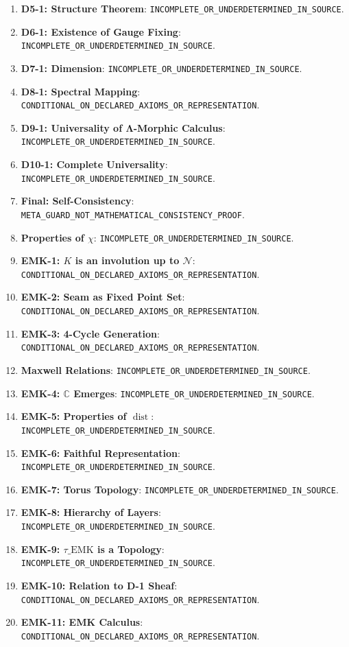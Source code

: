 \documentclass[12pt, oneside]{article}
\newcommand{\N}{\mathcal{N}}
\newcommand{\dist}{\mathop{\mathrm{dist}}}
\begin{document}
\begin{enumerate}
\item \textbf{D5-1: Structure Theorem}: \texttt{INCOMPLETE\_OR\_UNDERDETERMINED\_IN\_SOURCE}.
\item \textbf{D6-1: Existence of Gauge Fixing}: \texttt{INCOMPLETE\_OR\_UNDERDETERMINED\_IN\_SOURCE}.
\item \textbf{D7-1: Dimension}: \texttt{INCOMPLETE\_OR\_UNDERDETERMINED\_IN\_SOURCE}.
\item \textbf{D8-1: Spectral Mapping}: \texttt{CONDITIONAL\_ON\_DECLARED\_AXIOMS\_OR\_REPRESENTATION}.
\item \textbf{D9-1: Universality of Λ-Morphic Calculus}: \texttt{INCOMPLETE\_OR\_UNDERDETERMINED\_IN\_SOURCE}.
\item \textbf{D10-1: Complete Universality}: \texttt{INCOMPLETE\_OR\_UNDERDETERMINED\_IN\_SOURCE}.
\item \textbf{Final: Self-Consistency}: \texttt{META\_GUARD\_NOT\_MATHEMATICAL\_CONSISTENCY\_PROOF}.
\item \textbf{Properties of $\chi$}: \texttt{INCOMPLETE\_OR\_UNDERDETERMINED\_IN\_SOURCE}.
\item \textbf{EMK-1: $K$ is an involution up to $\N$}: \texttt{CONDITIONAL\_ON\_DECLARED\_AXIOMS\_OR\_REPRESENTATION}.
\item \textbf{EMK-2: Seam as Fixed Point Set}: \texttt{CONDITIONAL\_ON\_DECLARED\_AXIOMS\_OR\_REPRESENTATION}.
\item \textbf{EMK-3: 4-Cycle Generation}: \texttt{CONDITIONAL\_ON\_DECLARED\_AXIOMS\_OR\_REPRESENTATION}.
\item \textbf{Maxwell Relations}: \texttt{INCOMPLETE\_OR\_UNDERDETERMINED\_IN\_SOURCE}.
\item \textbf{EMK-4: $\mathbb{C}$ Emerges}: \texttt{INCOMPLETE\_OR\_UNDERDETERMINED\_IN\_SOURCE}.
\item \textbf{EMK-5: Properties of $\dist$}: \texttt{INCOMPLETE\_OR\_UNDERDETERMINED\_IN\_SOURCE}.
\item \textbf{EMK-6: Faithful Representation}: \texttt{INCOMPLETE\_OR\_UNDERDETERMINED\_IN\_SOURCE}.
\item \textbf{EMK-7: Torus Topology}: \texttt{INCOMPLETE\_OR\_UNDERDETERMINED\_IN\_SOURCE}.
\item \textbf{EMK-8: Hierarchy of Layers}: \texttt{INCOMPLETE\_OR\_UNDERDETERMINED\_IN\_SOURCE}.
\item \textbf{EMK-9: $\tau\_{\text{EMK}}$ is a Topology}: \texttt{INCOMPLETE\_OR\_UNDERDETERMINED\_IN\_SOURCE}.
\item \textbf{EMK-10: Relation to D-1 Sheaf}: \texttt{CONDITIONAL\_ON\_DECLARED\_AXIOMS\_OR\_REPRESENTATION}.
\item \textbf{EMK-11: EMK Calculus}: \texttt{CONDITIONAL\_ON\_DECLARED\_AXIOMS\_OR\_REPRESENTATION}.
\end{enumerate}
\end{document}
